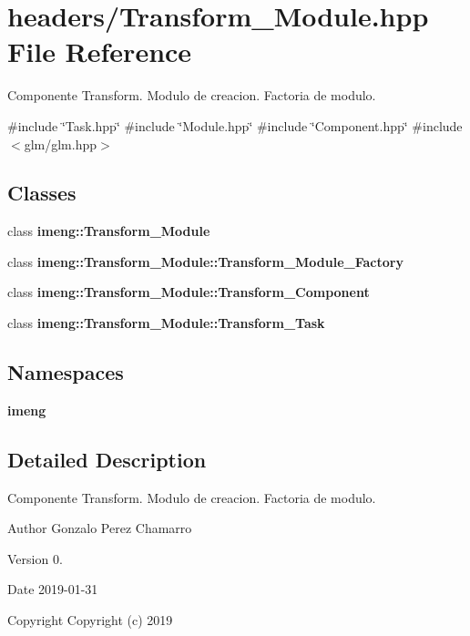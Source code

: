 \section{headers/\+Transform\+\_\+\+Module.hpp File Reference}
\label{_transform___module_8hpp}


Componente Transform. Modulo de creacion. Factoria de modulo.  


{\ttfamily \#include \char`\"{}Task.\+hpp\char`\"{}}\newline
{\ttfamily \#include \char`\"{}Module.\+hpp\char`\"{}}\newline
{\ttfamily \#include \char`\"{}Component.\+hpp\char`\"{}}\newline
{\ttfamily \#include $<$glm/glm.\+hpp$>$}\newline
\subsection*{Classes}
\begin{DoxyCompactItemize}
\item 
class \textbf{ imeng\+::\+Transform\+\_\+\+Module}
\item 
class \textbf{ imeng\+::\+Transform\+\_\+\+Module\+::\+Transform\+\_\+\+Module\+\_\+\+Factory}
\item 
class \textbf{ imeng\+::\+Transform\+\_\+\+Module\+::\+Transform\+\_\+\+Component}
\item 
class \textbf{ imeng\+::\+Transform\+\_\+\+Module\+::\+Transform\+\_\+\+Task}
\end{DoxyCompactItemize}
\subsection*{Namespaces}
\begin{DoxyCompactItemize}
\item 
 \textbf{ imeng}
\end{DoxyCompactItemize}


\subsection{Detailed Description}
Componente Transform. Modulo de creacion. Factoria de modulo. 

\begin{DoxyAuthor}{Author}
Gonzalo Perez Chamarro 
\end{DoxyAuthor}
\begin{DoxyVersion}{Version}
0. 
\end{DoxyVersion}
\begin{DoxyDate}{Date}
2019-\/01-\/31
\end{DoxyDate}
\begin{DoxyCopyright}{Copyright}
Copyright (c) 2019 
\end{DoxyCopyright}
